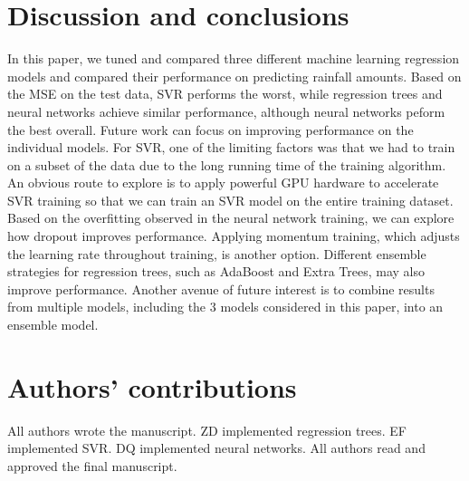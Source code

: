 \documentclass[12pt] {article}
\begin{document}
\section{Discussion and conclusions}
In this paper, we tuned and compared three different machine learning regression models and compared their performance on predicting rainfall amounts. Based on the MSE on the test data, SVR performs the worst, while regression trees and neural networks achieve similar performance, although neural networks peform the best overall. Future work can focus on improving performance on the individual models. For SVR, one of the limiting factors was that we had to train on a subset of the data due to the long running time of the training algorithm. An obvious route to explore is to apply powerful GPU hardware to accelerate SVR training so that we can train an SVR model on the entire training dataset. Based on the overfitting observed in the neural network training, we can explore how dropout improves performance. Applying momentum training, which adjusts the learning rate throughout training, is another option. Different ensemble strategies for regression trees, such as AdaBoost and Extra Trees, may also improve performance. Another avenue of future interest is to combine results from multiple models, including the 3 models considered in this paper, into an ensemble model.

\section{Authors' contributions}
All authors wrote the manuscript. ZD implemented regression trees. EF implemented SVR. DQ implemented neural networks. All authors read and approved the final manuscript.
\end{document}
